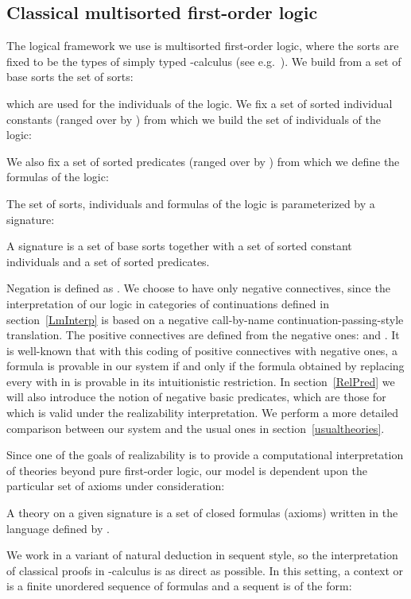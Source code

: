 \documentclass{CSML}
\begin{document}
\subsection{Classical multisorted first-order logic}
The logical framework we use is multisorted first-order logic, where the sorts are fixed to be the types of simply typed -calculus (see e.g.~\cite{TroelstraVanDalenConstructivism}). We build from a set of base sorts  the set of sorts:

which are used for the individuals of the logic. We fix a set of sorted individual constants (ranged over by ) from which we build the set of individuals of the logic:

We also fix a set of sorted predicates (ranged over by ) from which we define the formulas of the logic:

The set of sorts, individuals and formulas of the logic is parameterized by a signature:
\begin{defi}
A signature  is a set of base sorts together with a set of sorted constant individuals and a set of sorted predicates.
\end{defi}
Negation is defined as . We choose to have only negative connectives, since the interpretation of our logic in categories of continuations defined in section~\ref{LmInterp} is based on a negative call-by-name continuation-passing-style translation. The positive connectives are defined from the negative ones:  and . It is well-known that with this coding of positive connectives with negative ones, a formula  is provable in our system if and only if the formula obtained by replacing every  with  in  is provable in its intuitionistic restriction. In section~\ref{RelPred} we will also introduce the notion of negative basic predicates, which are those for which  is valid under the realizability interpretation. We perform a more detailed comparison between our system and the usual ones in section~\ref{usualtheories}.\par
Since one of the goals of realizability is to provide a computational interpretation of theories beyond pure first-order logic, our model is dependent upon the particular set of axioms under consideration:
\begin{defi}
A theory on a given signature  is a set  of closed formulas (axioms) written in the language defined by .
\end{defi}
We work in a variant of natural deduction in sequent style, so the interpretation of classical proofs in -calculus is as direct as possible. In this setting, a context  or  is a finite unordered sequence of formulas and a sequent is of the form:
\end{document}
